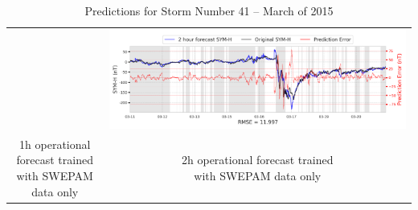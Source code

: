 \documentclass[draft,sw]{agutexSI2019}
\begin{document}
\begin{table}
\begin{tabular}{cc}
&
\includegraphics[width=0.49\linewidth]{paper_plots_shade/2h_swepam_rt/2h_swepam_rt_storm_41.png}
\\
\shortstack{1h operational forecast trained\\ with SWEPAM data only} & \shortstack{2h operational forecast trained\\ with SWEPAM data only}
\vspace*{12pt}
\\
\end{tabular}
\caption{Predictions for Storm Number 41 -- March of 2015}
\label{storm-41}
\end{table}
\end{document}
